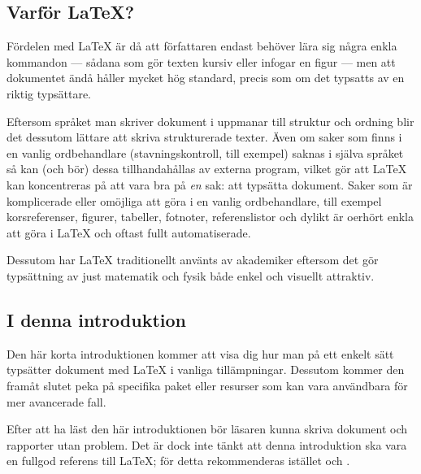 \documentclass[draft,swe,10pt,nofont]{skrapport}
\makeatletter
\let\@oldLaTeX\LaTeX
\def\LaTeX{\texorpdfstring{\@oldLaTeX}{LaTeX}}
\makeatother
\begin{document}
	\subsection*{Varför \LaTeX?}
	\addcontentsline{toc}{subsection}{Varför \LaTeX{}?}
	Fördelen med \LaTeX{} är då att författaren endast behöver lära sig några
	enkla kommandon — sådana som gör texten kursiv eller infogar en figur
	— men att dokumentet ändå håller mycket hög standard, precis som om
	det typsatts av en riktig typsättare.
	
	Eftersom språket man skriver dokument i uppmanar till struktur och ordning
	blir det dessutom lättare att skriva strukturerade texter. Även om saker
	som finns i en vanlig ordbehandlare (stavningskontroll, till exempel) saknas i
	själva språket så kan (och bör) dessa tillhandahållas av externa program,
	vilket gör att \LaTeX{} kan koncentreras på att vara bra på \emph{en} sak:
	att typsätta dokument. Saker som är komplicerade eller omöjliga att göra
	i en vanlig ordbehandlare, till exempel korsreferenser, figurer, tabeller,
	fotnoter, referenslistor och dylikt är oerhört enkla att göra i \LaTeX{}
	och oftast fullt automatiserade.
	
	Dessutom har \LaTeX{} traditionellt använts av akademiker eftersom det gör 
	typsättning av just matematik och fysik både enkel och visuellt attraktiv. 
	
	\subsection*{I denna introduktion}
	Den här korta introduktionen kommer att visa dig hur man på ett enkelt
	sätt typsätter dokument med \LaTeX{} i vanliga tillämpningar.
	Dessutom kommer den framåt slutet peka på specifika paket eller
	resurser som kan vara användbara för mer avancerade fall.
	
	Efter att ha läst den här introduktionen bör läsaren kunna skriva
	dokument och rapporter utan problem. Det är dock inte tänkt att denna
	introduktion ska vara en fullgod referens till \LaTeX; för detta
	rekommenderas istället  och
	.
	
\end{document}
